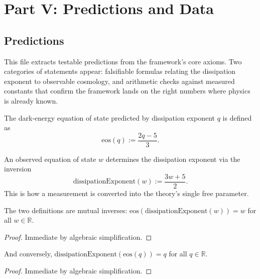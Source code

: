 \section{Part V: Predictions and Data}

\subsection{Predictions}

This file extracts testable predictions from the framework's core axioms.  Two categories of statements appear: falsifiable formulas relating the dissipation exponent to observable cosmology, and arithmetic checks against measured constants that confirm the framework lands on the right numbers where physics is already known.

\begin{definition}
The dark-energy equation of state predicted by dissipation exponent $q$ is defined as
\begin{equation}
\text{eos}(q) := \frac{2q - 5}{3}.
\end{equation}
\end{definition}

\begin{definition}
An observed equation of state $w$ determines the dissipation exponent via the inversion
\begin{equation}
\text{dissipationExponent}(w) := \frac{3w + 5}{2}.
\end{equation}
This is how a measurement is converted into the theory's single free parameter.
\end{definition}

\begin{theorem}
The two definitions are mutual inverses: $\text{eos}(\text{dissipationExponent}(w)) = w$ for all $w \in \mathbb{R}$.
\begin{proof}
Immediate by algebraic simplification.
\end{proof}
\end{theorem}

\begin{theorem}
And conversely, $\text{dissipationExponent}(\text{eos}(q)) = q$ for all $q \in \mathbb{R}$.
\begin{proof}
Immediate by algebraic simplification.
\end{proof}
\end{theorem}


